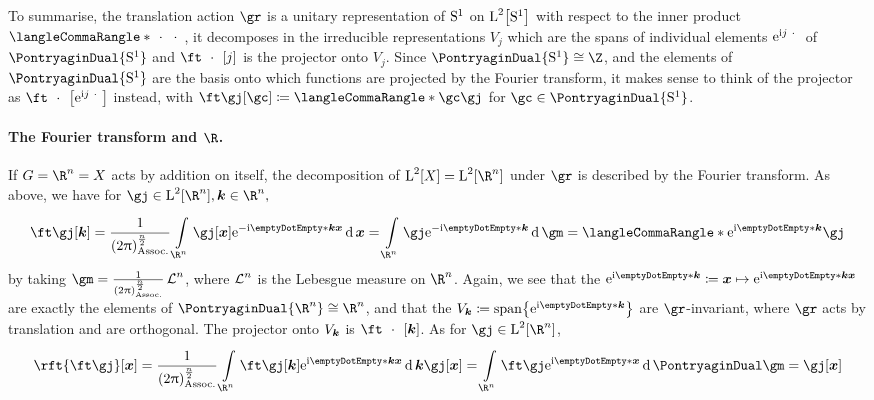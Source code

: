 \documentclass[10pt]{article}
\newcommand{\Rn}{{\R^n}}
\newcommand{\ftnrm}{\frac{1}{\pa{2\Pi}^\frac{n}{2}} }
\newenvironment{supplemental}{
\begin{mdframed}%
[hidealllines=true,                 %
  backgroundcolor=red!15!yellow!10  %
]}{\end{mdframed}}
\begin{document}
\begin{supplemental}
To summarise, the translation action $\gr$ is a unitary representation of $\mathrm{S}^{1}$ on $\Lspace[2]\of{\UnitSphere 1}$ with respect to the inner product $\LTwoInner \placeholder\placeholder$, it decomposes in the irreducible representations $V_j$ which are the spans of individual elements $\mathrm{e}^{\mathrm{i} j \,\:\cdot\:\,}$ of $\PontryaginDual{\UnitSphere 1}$ and $\ft\placeholder\of{j}$ is the projector onto $V_j$. Since $\PontryaginDual {\UnitSphere 1} \Isomorphic \Z$, and the elements of $\PontryaginDual {\UnitSphere 1}$ are the basis onto which functions are projected by the Fourier transform, it makes sense to think of the projector as $\ft\placeholder\of{\E^{\I j \placeholder}}$ instead, with $\ft\gj\of{\gc}\DefineAs\LTwoInner\gc\gj$ for $\gc\in\PontryaginDual {\UnitSphere 1}$.
 
\paragraph{The Fourier transform and $\R$.}
If $G=\Rn=X$ acts by addition on itself, the decomposition of $\Lspace[2]\of X = \Lspace[2]\of{\Rn}$ under $\gr$ is described by the Fourier transform. As above, we have for $\gj\in\Lspace[2]\of\Rn, \vk\in\Rn,$
\begin{equation*}
 \ft\gj\of \vk = \ftnrm\int \Rn \gj\of \vx \E^{-\I \scal\vk \vx}\diffd \vx = \int \Rn \gj \E^{-\I \scal\vk{}}\diffd \gm = \LTwoInner {\E^{\I \scal\vk{}}} \gj
\end{equation*}
by taking $\gm = \ftnrm\LebesgueMeasure n$, where $\operatorname{\mathcal{L}}^{n}$ is the Lebesgue measure on $\Rn$. Again, we see that the $\E^{\I \scal\vk{}}\DefineAs \FunctionBody \vx \E^{\I \scal\vk{\vx}}$ are exactly the elements of $\PontryaginDual\Rn\Isomorphic\Rn$, and that the $V_\vk\DefineAs\LinearSpan\set{\E^{\I \scal\vk{}}}$ are $\gr$-invariant, where $\gr$ acts by translation and are orthogonal. The projector onto $V_\vk$ is  $\ft\placeholder\of \vk$. As for $\gj\in\Lspace[2]\of\Rn$,
\begin{equation*} 
\rft{\ft\gj}\of\vx = \ftnrm\int\Rn\ft\gj\of\vk\E^{\I\scal\vk\vx}\diffd\vk \gj\of\vx=
\int\Rn\ft\gj\E^{\I\scal\vx{}}\diffd \PontryaginDual\gm = \gj\of\vx
\end{equation*}


\end{supplemental}
\end{document}
